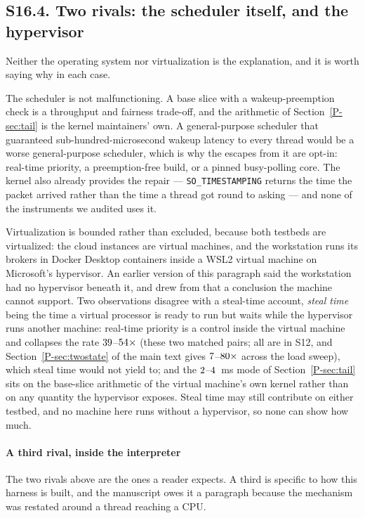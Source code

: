 \documentclass[10pt,journal,onecolumn]{IEEEtran}
\newcommand{\mainSpectrum}{\ref{P-sec:tail}}        %
\newcommand{\mainSettle}{\ref{P-sec:twostate}}            %
\begin{document}
\subsection{S16.4. Two rivals: the scheduler itself, and the hypervisor}

Neither the operating system nor virtualization is the explanation, and it is worth saying
why in each case.

The scheduler is not malfunctioning. A base slice with a wakeup-preemption check is a
throughput and fairness trade-off, and the arithmetic of Section~\mainSpectrum{} is the kernel
maintainers' own. A general-purpose scheduler that guaranteed sub-hundred-microsecond wakeup
latency to every thread would be a worse general-purpose scheduler, which is why the escapes
from it are opt-in: real-time priority, a preemption-free build, or a pinned busy-polling
core. The kernel also already provides the repair --- \texttt{SO\_TIMESTAMPING} returns the
time the packet arrived rather than the time a thread got round to asking --- and none of the
instruments we audited uses it.

Virtualization is bounded rather than excluded, because both testbeds are virtualized: the
cloud instances are virtual machines, and the workstation runs its brokers in Docker Desktop
containers inside a WSL2 virtual machine on Microsoft's hypervisor. An earlier version of this
paragraph said the workstation had no hypervisor beneath it, and drew from that a conclusion
the machine cannot support. Two observations disagree with a
steal-time account, \emph{steal time} being the time a virtual processor is ready to run but waits while the hypervisor runs another machine: real-time priority is a control inside the virtual machine and collapses the rate
$39$--$54\times$ (these two matched pairs; all \rtPairsWord{} are in S12, and Section~\mainSettle{} of the main
text gives $7$--$80\times$ across the load sweep), which steal time would not yield
to; and the
$2$--$4$~ms mode of Section~\mainSpectrum{} sits on the base-slice arithmetic of the virtual
machine's own kernel rather than on any quantity the hypervisor exposes. Steal time may still contribute on either
testbed, and no machine here runs without a hypervisor, so none can show how much.

\paragraph{A third rival, inside the interpreter}
The two rivals above are the ones a reader expects. A third is specific to how this harness is
built, and the manuscript owes it a paragraph because the mechanism was restated around a
thread reaching a CPU.
\end{document}
